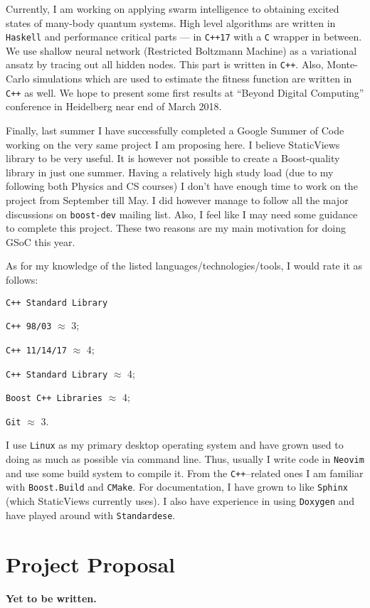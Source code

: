 \documentclass[a4paper,12pt]{article}
\begin{document}
    Currently, I am working on applying swarm intelligence to obtaining excited
    states of many-body quantum systems. High level algorithms are written in
    \texttt{Haskell} and performance critical parts --- in \texttt{C++17} with a
    \texttt{C} wrapper in between. We use shallow neural network (Restricted
    Boltzmann Machine) as a variational ansatz by tracing out all hidden nodes.
    This part is written in \texttt{C++}. Also, Monte-Carlo simulations which
    are used to estimate the fitness function are written in \texttt{C++} as
    well. We hope to present some first results at ``Beyond Digital Computing''
    conference in Heidelberg near end of March 2018.

    Finally, last summer I have successfully completed a Google Summer of Code
    working on the very same project I am proposing here. I believe StaticViews
    library to be very useful. It is however not possible to create a
    Boost-quality library in just one summer. Having a relatively high study
    load (due to my following both Physics and CS courses) I don't have enough
    time to work on the project from September till May. I did however manage to
    follow all the major discussions on \texttt{boost-dev} mailing list. Also, I
    feel like I may need some guidance to complete this project. These two
    reasons are my main motivation for doing GSoC this year.

    As for my knowledge of the listed languages/technologies/tools, I would rate
    it as follows:
    \begin{labeling}{\texttt{C++ Standard Library}}
    \item [\texttt{C++ 98/03}] $\approx$ 3;
    \item [\texttt{C++ 11/14/17}] $\approx$ 4;
    \item [\texttt{C++ Standard Library}] $\approx$ 4;
    \item [\texttt{Boost C++ Libraries}] $\approx$ 4;
    \item [\texttt{Git}] $\approx$ 3.
    \end{labeling}

    I use \texttt{Linux} as my primary desktop operating system and have grown
    used to doing as much as possible via command line. Thus, usually I write
    code in \texttt{Neovim} and use some build system to compile it. From the
    \texttt{C++}--related ones I am familiar with \texttt{Boost.Build} and
    \texttt{CMake}. For documentation, I have grown to like \texttt{Sphinx}
    (which StaticViews currently uses). I also have experience in using
    \texttt{Doxygen} and have played around with \texttt{Standardese}.

\section{Project Proposal}
    \textbf{Yet to be written.}
\end{document}
